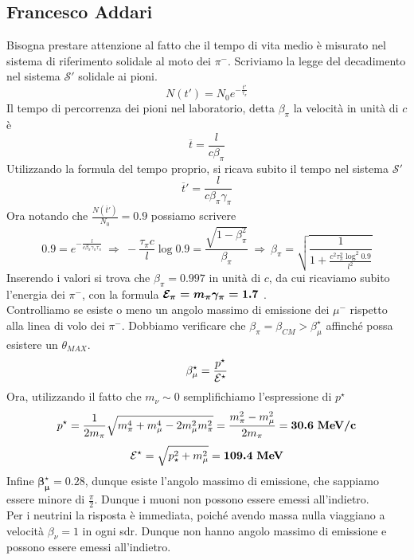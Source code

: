 \documentclass[12pt,twoside,a4]{article}
\begin{document}
\newpage
\subsection{Francesco Addari}
\begin{solution}
	Bisogna prestare attenzione al fatto che il tempo di vita medio è misurato nel sistema di riferimento solidale al moto dei $\pi^-$. Scriviamo la legge del decadimento nel sistema $\mathcal{S}'$ solidale ai pioni.
$$ N(t') = N_0 e^{- \frac{t'}{\tau_\pi}} $$
Il tempo di percorrenza dei pioni nel laboratorio, detta $\beta_\pi$ la velocità  in unità  di $c$ è
$$ \overline{t} = \frac{l}{c \beta_\pi} $$
Utilizzando la formula del tempo proprio, si ricava subito il tempo nel sistema $\mathcal{S}'$
$$ \overline{t}' = \frac{l}{c \beta_\pi \gamma_\pi} $$
Ora notando che $\frac{N(\overline{t}')}{N_0} = 0.9$ possiamo scrivere
$$ 0.9 = e^{-\frac{l}{c \beta_\pi \gamma_\pi \tau_\pi}}  \  \Rightarrow  \  
- \frac{\tau_\pi c}{l} \log 0.9 = \frac{\sqrt{1 - \beta_\pi^2}}{\beta_\pi}   \  \Rightarrow  \  
\beta_\pi = \sqrt{\frac{1}{1 + \frac{c^2 \tau_\pi^2 \log^2 0.9}{l^2}}} $$
Inserendo i valori si trova che $\beta_\pi = 0.997$ in unità  di $c$, da cui ricaviamo subito l'energia dei $\pi^-$, con la formula $\boldsymbol{\mathcal{E}_\pi = m_\pi \gamma_\pi = 1.7}$ .
\\
Controlliamo se esiste o meno un angolo massimo di emissione dei $\mu^-$ rispetto alla linea di volo dei $\pi^-$. Dobbiamo verificare che $\beta_\pi = \beta_{CM} > \beta_\mu^\star$ affinché possa esistere un $\theta_{MAX}$.
$$ \beta_\mu^\star = \frac{p^\star}{\mathcal{E}^\star}$$
Ora, utilizzando il fatto che $m_\nu \sim 0$ semplifichiamo l'espressione di $p^\star$ 
$$ p^\star = \frac{1}{2 m_\pi} \sqrt{m_\pi^4 + m_\mu^4 -2 m_\mu^2 m_\pi^2} = \frac{m_\pi^2 - m_\mu^2}{2 m_\pi} = \boldsymbol{30.6 \mbox{ \textbf{MeV/c}}}$$
$$ \mathcal{E}^\star = \sqrt{p_\star^2 + m_\mu^2} = \boldsymbol{109.4 \mbox{ \textbf{MeV}}}$$
Infine $\boldsymbol{\beta_\mu^\star = 0.28}$, dunque esiste l'angolo massimo di emissione, che sappiamo essere minore di $\frac{\pi}{2}$. Dunque i muoni non possono essere emessi all'indietro. 
\\
Per i neutrini la risposta è immediata, poiché avendo massa nulla viaggiano a velocità  $\beta_\nu = 1$ in ogni sdr. Dunque non hanno angolo massimo di emissione e possono essere emessi all'indietro.
\end{solution}
\newpage
\end{document}
